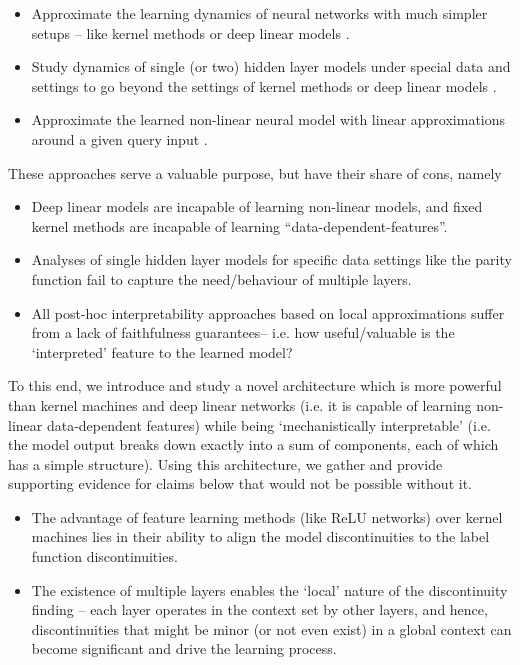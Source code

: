 \documentclass{article} %
\renewcommand{\>}{{\rightarrow}}
\renewcommand{\=}{\stackrel{\triangle}{=}}
\newcommand{\0}{{\mathbf 0}}
\begin{document}
\begin{itemize}
\item Approximate the learning dynamics of neural networks with much simpler setups -- like kernel methods \citep{Arora+19} or deep linear models \citep{Saxe+14}.
\item Study dynamics of single (or two) hidden layer models under special data and settings to go beyond the settings of kernel methods or deep linear models \citep{Damian22,ba2022high, Nichani+23}.
\item Approximate the learned non-linear neural model with linear approximations around a given query input \citep{ribeiro2016should,selvaraju2017grad}.
\end{itemize}

These approaches serve a valuable purpose, but have their share of cons, namely

\begin{itemize}
\item Deep linear models are incapable of learning non-linear models, and fixed kernel methods are incapable of learning ``data-dependent-features''. 
\item Analyses of single hidden layer models for specific data settings like the parity function fail to capture the need/behaviour of multiple layers.
\item All post-hoc interpretability approaches based on local approximations suffer from a lack of faithfulness guarantees-- i.e. how useful/valuable is the `interpreted' feature to the learned model?
\end{itemize}

To this end, we introduce and study a novel architecture which is more powerful than kernel machines and deep linear networks (i.e. it is capable of learning non-linear data-dependent features) while being `mechanistically interpretable' (i.e. the model output breaks down exactly into a sum of components, each of which has a simple structure). Using this architecture, we gather and provide supporting evidence for claims below that would not be possible without it.
\begin{itemize}
    \item The advantage of feature learning methods (like ReLU networks) over kernel machines lies in their ability to align the model discontinuities to the label function discontinuities.
    \item The existence of multiple layers enables the `local' nature of the discontinuity finding -- each layer operates in the context set by other layers, and hence, discontinuities that might be minor (or not even exist) in a global context can become significant and drive the learning process.
\end{itemize}
\end{document}
